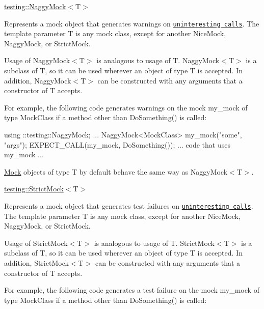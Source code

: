 {\ttfamily \mbox{\hyperlink{classtesting_1_1NaggyMock}{testing\+::\+Naggy\+Mock}}$<$T$>$}

Represents a mock object that generates warnings on \href{../gmock_cook_book.md#uninteresting-vs-unexpected}{\tt uninteresting calls}. The template parameter {\ttfamily T} is any mock class, except for another {\ttfamily Nice\+Mock}, {\ttfamily Naggy\+Mock}, or {\ttfamily Strict\+Mock}.

Usage of {\ttfamily Naggy\+Mock$<$T$>$} is analogous to usage of {\ttfamily T}. {\ttfamily Naggy\+Mock$<$T$>$} is a subclass of {\ttfamily T}, so it can be used wherever an object of type {\ttfamily T} is accepted. In addition, {\ttfamily Naggy\+Mock$<$T$>$} can be constructed with any arguments that a constructor of {\ttfamily T} accepts.

For example, the following code generates warnings on the mock {\ttfamily my\+\_\+mock} of type {\ttfamily Mock\+Class} if a method other than {\ttfamily Do\+Something()} is called\+:


\begin{DoxyCode}
using ::testing::NaggyMock;
...
NaggyMock<MockClass> my\_mock(\textcolor{stringliteral}{"some"}, \textcolor{stringliteral}{"args"});
EXPECT\_CALL(my\_mock, DoSomething());
... code that uses my\_mock ...
\end{DoxyCode}


\mbox{\hyperlink{classMock}{Mock}} objects of type {\ttfamily T} by default behave the same way as {\ttfamily Naggy\+Mock$<$T$>$}.

{\ttfamily \mbox{\hyperlink{classtesting_1_1StrictMock}{testing\+::\+Strict\+Mock}}$<$T$>$}

Represents a mock object that generates test failures on \href{../gmock_cook_book.md#uninteresting-vs-unexpected}{\tt uninteresting calls}. The template parameter {\ttfamily T} is any mock class, except for another {\ttfamily Nice\+Mock}, {\ttfamily Naggy\+Mock}, or {\ttfamily Strict\+Mock}.

Usage of {\ttfamily Strict\+Mock$<$T$>$} is analogous to usage of {\ttfamily T}. {\ttfamily Strict\+Mock$<$T$>$} is a subclass of {\ttfamily T}, so it can be used wherever an object of type {\ttfamily T} is accepted. In addition, {\ttfamily Strict\+Mock$<$T$>$} can be constructed with any arguments that a constructor of {\ttfamily T} accepts.

For example, the following code generates a test failure on the mock {\ttfamily my\+\_\+mock} of type {\ttfamily Mock\+Class} if a method other than {\ttfamily Do\+Something()} is called\+:


